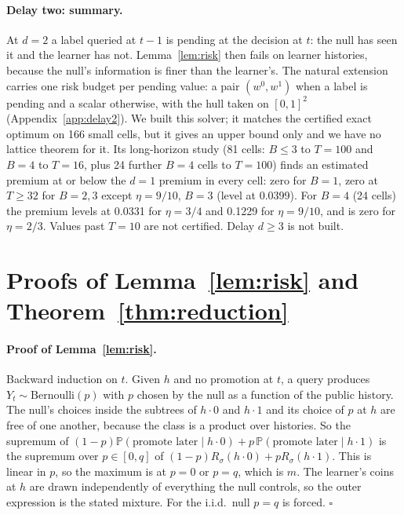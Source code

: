 \documentclass{article}
\theoremstyle{plain}
\theoremstyle{definition}
\theoremstyle{remark}
\newcommand{\PP}{\mathbb{P}}
\begin{document}
\paragraph{Delay two: summary.} At $d=2$ a label queried at $t-1$ is pending at the decision at $t$: the null has seen it and the learner has not. Lemma~\ref{lem:risk} then fails on learner histories, because the null's information is finer than the learner's. The natural extension carries one risk budget per pending value: a pair $(w^0,w^1)$ when a label is pending and a scalar otherwise, with the hull taken on $[0,1]^2$ (Appendix~\ref{app:delay2}). We built this solver; it matches the certified exact optimum on 166 small cells, but it gives an upper bound only and we have no lattice theorem for it. Its long-horizon study (81 cells: $B\le3$ to $T=100$ and $B=4$ to $T=16$, plus 24 further $B=4$ cells to $T=100$) finds an estimated premium at or below the $d=1$ premium in every cell: zero for $B=1$, zero at $T\ge32$ for $B=2,3$ except $\eta=9/10$, $B=3$ (level at 0.0399). For $B=4$ (24 cells) the premium levels at 0.0331 for $\eta=3/4$ and 0.1229 for $\eta=9/10$, and is zero for $\eta=2/3$. Values past $T=10$ are not certified. Delay $d\ge3$ is not built.
\FloatBarrier

\section{Proofs of Lemma~\ref{lem:risk} and Theorem~\ref{thm:reduction}}
\label{app:proofs}

\paragraph{Proof of Lemma~\ref{lem:risk}.} Backward induction on $t$. Given $h$ and no promotion at $t$, a query produces $Y_t\sim\mathrm{Bernoulli}(p)$ with $p$ chosen by the null as a function of the public history. The null's choices inside the subtrees of $h\cdot0$ and $h\cdot1$ and its choice of $p$ at $h$ are free of one another, because the class is a product over histories. So the supremum of $(1-p)\PP(\text{promote later}\mid h\cdot0)+p\,\PP(\text{promote later}\mid h\cdot1)$ is the supremum over $p\in[0,q]$ of $(1-p)R_\sigma(h\cdot0)+pR_\sigma(h\cdot1)$. This is linear in $p$, so the maximum is at $p=0$ or $p=q$, which is $m$. The learner's coins at $h$ are drawn independently of everything the null controls, so the outer expression is the stated mixture. For the i.i.d.\ null $p=q$ is forced. \hfill$\square$
\end{document}
